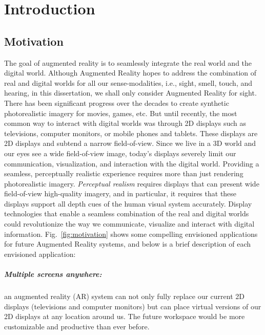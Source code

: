 \chapter{Introduction}
\label{chapter:introduction}

\section{Motivation}

The goal of augmented reality is to seamlessly integrate the real world and the digital world.
Although Augmented Reality hopes to address the combination of real and digital worlds for all our sense-modalities, i.e., sight, smell, touch, and hearing, in this dissertation, we shall only consider Augmented Reality for sight. 
There has been significant progress over the decades to create synthetic photorealistic imagery for movies, games, etc. 
But until recently, the most common way to interact with digital worlds was through 2D displays such as televisions, computer monitors, or mobile phones and tablets. 
These displays are 2D displays and subtend a narrow field-of-view. 
Since we live in a 3D world and our eyes see a wide field-of-view image, today’s displays severely limit our communication, visualization, and interaction with the digital world. 
Providing a seamless, perceptually realistic experience requires more than just rendering photorealistic imagery. 
\emph{Perceptual realism} requires displays that can present wide field-of-view high-quality imagery, and in particular, it requires that these displays support all depth cues of the human visual system \cite{Palmer:1999, Howard:2002} accurately. 
Display technologies that enable a seamless combination of the real and digital worlds could revolutionize the way we communicate, visualize and interact with digital information.
Fig.~\ref{fig:motivation} shows some compelling envisioned applications for future Augmented Reality systems, and below is a brief description of each envisioned application:



\paragraph{Multiple screens anywhere:} an augmented reality (AR) system can not only fully replace our current 2D displays (televisions and computer monitors) but can place virtual versions of our 2D displays at any location around us. 
The future workspace would be more customizable and productive than ever before.
